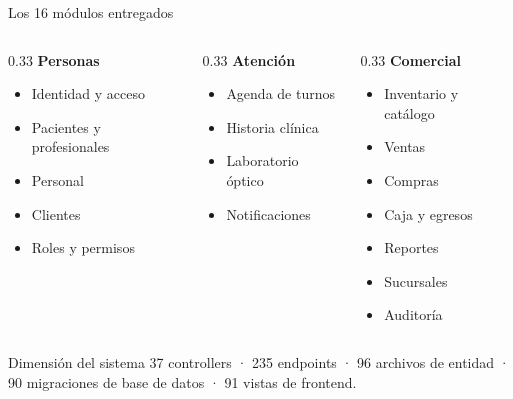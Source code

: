 \documentclass[11pt,aspectratio=169]{beamer}
\begin{document}
\begin{frame}{Los 16 módulos entregados}
  \small
  \begin{columns}[T,onlytextwidth]
    \begin{column}{0.33\textwidth}
      {\color{sigaAzul}\textbf{Personas}}
      \begin{itemize}\small
        \item Identidad y acceso
        \item Pacientes y profesionales
        \item Personal
        \item Clientes
        \item Roles y permisos
      \end{itemize}
    \end{column}
    \begin{column}{0.33\textwidth}
      {\color{sigaAzul}\textbf{Atención}}
      \begin{itemize}\small
        \item Agenda de turnos
        \item Historia clínica
        \item Laboratorio óptico
        \item Notificaciones
      \end{itemize}
    \end{column}
    \begin{column}{0.33\textwidth}
      {\color{sigaAzul}\textbf{Comercial}}
      \begin{itemize}\small
        \item Inventario y catálogo
        \item Ventas
        \item Compras
        \item Caja y egresos
        \item Reportes
        \item Sucursales
        \item Auditoría
      \end{itemize}
    \end{column}
  \end{columns}

  \vspace{8pt}
  \begin{block}{Dimensión del sistema}
    \small 37 controllers · 235 endpoints · 96 archivos de entidad ·
    90 migraciones de base de datos · 91 vistas de frontend.
  \end{block}
\end{frame}
\end{document}
